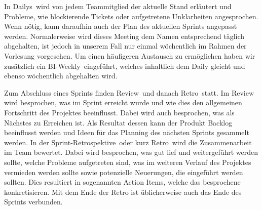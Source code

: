    In \glqq Dailys\grqq~wird von jedem Teammitglied der aktuelle Stand erläutert und Probleme, wie blockierende Tickets oder aufgetretene 
    Unklarheiten angesprochen. Wenn nötig, kann daraufhin auch der Plan des aktuellen Sprints angepasst werden. Normalerweise wird dieses Meeting 
    dem Namen entsprechend täglich abgehalten, ist jedoch in unserem Fall nur einmal wöchentlich im Rahmen der Vorlesung vorgesehen. Um einen 
    häufigeren Austausch zu ermöglichen haben wir zusätzlich ein \glqq BI-Weekly\grqq~eingeführt, welches inhaltlich dem Daily gleicht und ebenso 
    wöchentlich abgehalten wird.

    Zum Abschluss eines Sprints finden \glqq Review\grqq~und danach \glqq Retro\grqq~statt. Im Review wird besprochen, was im Sprint erreicht 
    wurde und wie dies den allgemeinen Fortschritt des Projektes beeinflusst. Dabei wird auch besprochen, was als Nächstes zu Erreichen ist. 
    Als Resultat dessen kann der Produkt Backlog beeinflusst werden und Ideen für das Planning des nächsten Sprints gesammelt werden. 
    In der \glqq Sprint-Retrospektive\grqq~oder kurz \glqq Retro\grqq~wird die Zusammenarbeit im Team bewertet. Dabei wird besprochen, was gut 
    lief und weitergeführt werden sollte, welche Probleme aufgetreten sind, was im weiteren Verlauf des Projektes vermieden werden sollte sowie 
    potenzielle Neuerungen, die eingeführt werden sollten. Dies resultiert in sogenannten Action Items, welche das besprochene konkretisieren.
    Mit dem Ende der Retro ist üblicherweise auch das Ende des Sprints verbunden.
